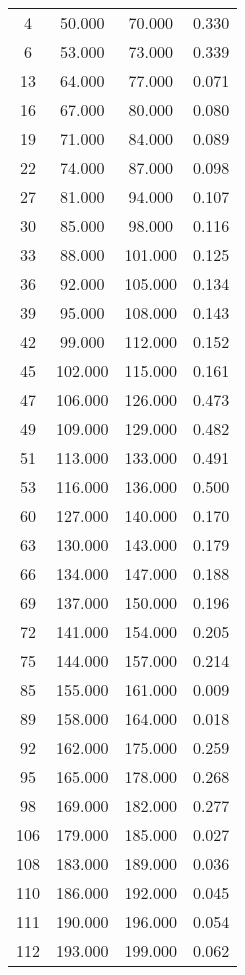 % 
\begin{tabular}{cccc}
  \hline
  \hline
4 & 50.000 & 70.000 & 0.330 \\ 
  6 & 53.000 & 73.000 & 0.339 \\ 
  13 & 64.000 & 77.000 & 0.071 \\ 
  16 & 67.000 & 80.000 & 0.080 \\ 
  19 & 71.000 & 84.000 & 0.089 \\ 
  22 & 74.000 & 87.000 & 0.098 \\ 
  27 & 81.000 & 94.000 & 0.107 \\ 
  30 & 85.000 & 98.000 & 0.116 \\ 
  33 & 88.000 & 101.000 & 0.125 \\ 
  36 & 92.000 & 105.000 & 0.134 \\ 
  39 & 95.000 & 108.000 & 0.143 \\ 
  42 & 99.000 & 112.000 & 0.152 \\ 
  45 & 102.000 & 115.000 & 0.161 \\ 
  47 & 106.000 & 126.000 & 0.473 \\ 
  49 & 109.000 & 129.000 & 0.482 \\ 
  51 & 113.000 & 133.000 & 0.491 \\ 
  53 & 116.000 & 136.000 & 0.500 \\ 
  60 & 127.000 & 140.000 & 0.170 \\ 
  63 & 130.000 & 143.000 & 0.179 \\ 
  66 & 134.000 & 147.000 & 0.188 \\ 
  69 & 137.000 & 150.000 & 0.196 \\ 
  72 & 141.000 & 154.000 & 0.205 \\ 
  75 & 144.000 & 157.000 & 0.214 \\ 
  85 & 155.000 & 161.000 & 0.009 \\ 
  89 & 158.000 & 164.000 & 0.018 \\ 
  92 & 162.000 & 175.000 & 0.259 \\ 
  95 & 165.000 & 178.000 & 0.268 \\ 
  98 & 169.000 & 182.000 & 0.277 \\ 
  106 & 179.000 & 185.000 & 0.027 \\ 
  108 & 183.000 & 189.000 & 0.036 \\ 
  110 & 186.000 & 192.000 & 0.045 \\ 
  111 & 190.000 & 196.000 & 0.054 \\ 
  112 & 193.000 & 199.000 & 0.062 \\ 
   \hline
\end{tabular}
